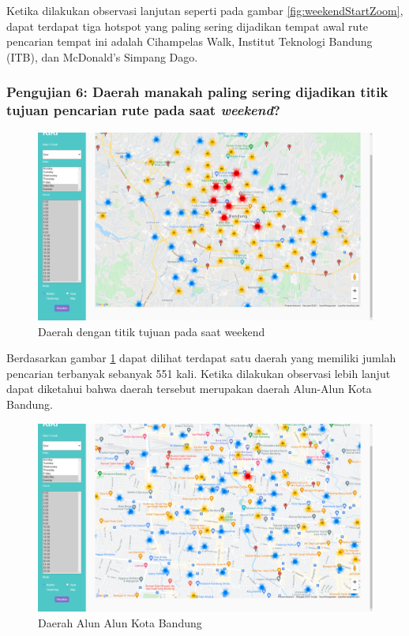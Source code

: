 Ketika dilakukan observasi lanjutan seperti pada gambar \ref{fig:weekendStartZoom}, dapat terdapat tiga hotspot yang paling sering dijadikan tempat awal rute pencarian tempat ini adalah Cihampelas Walk, Institut Teknologi Bandung (ITB), dan McDonald's Simpang Dago.


\subsubsection{Pengujian 6: Daerah manakah paling sering dijadikan titik tujuan pencarian rute pada saat \textit{weekend}?}
\label{subsec:pengujian6}

\begin{figure}[H]
	\centering  
	\includegraphics[scale=0.3]{Gambar/pengujian/weekend-end.png}  
	\caption[Daerah dengan titik tujuan pada saat weekend]{Daerah dengan titik tujuan pada saat weekend } 
	\label{fig:weekendEnd}
\end{figure}
Berdasarkan gambar \ref{fig:weekendEnd} dapat dilihat terdapat satu daerah yang memiliki jumlah pencarian terbanyak sebanyak 551 kali. Ketika dilakukan observasi lebih lanjut dapat diketahui bahwa daerah tersebut merupakan daerah Alun-Alun Kota Bandung.

\begin{figure}[H]
	\centering  
	\includegraphics[scale=0.3]{Gambar/pengujian/weekend-end-zoomed.png}  
	\caption[Daerah Alun Alun Kota Bandung ]{Daerah Alun Alun Kota Bandung } 
	\label{fig:weekendEndZoomed}
\end{figure}

